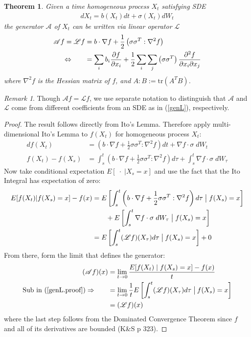 \documentclass[12pt]{article}
\theoremstyle{plain}
\newtheorem{thm}{Theorem}[section]
\theoremstyle{definition}
\theoremstyle{remark}
\newtheorem*{rmk}{Remark}
\begin{document}
\begin{thm}
Given a time homogeneous process $X_t$ satisfying SDE
\begin{align*}
  dX_t = b(X_t) dt + \sigma(X_t) dW_t
\end{align*}
the generator $\mathscr{A}$ of $X_t$ can be written via linear operator
$\mathscr{L}$
\begin{align}
  \mathscr{A}f =
  \mathscr{L}f &= b \cdot \nabla f
  + \frac{1}{2} \left(\sigma \sigma^T:\nabla^2 f\right)\label{genL} \\
  \Leftrightarrow \qquad
  &= \sum_i b_i \frac{\partial f}{\partial x_i}
  + \frac{1}{2} \sum_i \sum_j \left(\sigma \sigma^T\right)
    \frac{\partial^2 f}{\partial x_i \partial x_j}\notag
\end{align}
where $\nabla^2 f$ is the Hessian matrix of $f$, and $A:B :=
\text{tr}(A^T B)$.
\end{thm}
\begin{rmk}
Though $\mathscr{A}f = \mathscr{L}f$, we use separate notation to
distinguish that $\mathscr{A}$ and $\mathscr{L}$ come from different
coefficients from an SDE as in (\ref{genL}), respectively.
\end{rmk}
\begin{proof}
The result follows directly from Ito's Lemma. Therefore apply
multi-dimensional Ito's Lemma to $f(X_t)$ for homogeneous process $X_t$:
\begin{align*}
  df(X_t) &=
  \left(b\cdot \nabla f + \frac{1}{2}\sigma\sigma^T : \nabla^2 f\right)
  dt
  + \nabla f\cdot \sigma \;dW_t\\
  f(X_t) - f(X_s) &=
  \int^t_s
  \left(b\cdot \nabla f + \frac{1}{2}\sigma\sigma^T : \nabla^2 f\right)
  d\tau
  +
  \int^t_s
  \nabla f\cdot \sigma \;dW_\tau
\end{align*}
Now take conditional expectation $E[\;\cdot\;|X_s=x]$ and use the fact
that the Ito Integral has expectation of zero:
\begin{align}
  E[f(X_t)|f(X_s)=x] - f(x) &=
  E\left[
  \int^t_s
  \left(b\cdot \nabla f + \frac{1}{2}\sigma\sigma^T : \nabla^2 f\right)
  d\tau
  \; \big|\; f(X_s)=x\right]\notag\\
  &\qquad
  +
  E\left[
  \int^t_s
  \nabla f\cdot \sigma \;dW_\tau
  \; \big|\;f(X_s)=x\right]
  \notag\\
  &=
  E\left[ \int^t_s (\mathscr{L} f)(X_\tau) d\tau
    \;\big|\:f(X_s)=x\right] + 0
  \label{genL.proof}
\end{align}
From there, form the limit that defines the generator:
\begin{align*}
  (\mathscr{A}f)(x)
  &=\lim_{t\rightarrow0} \frac{E[f(X_t)\;|\;f(X_s)=x] - f(x)}{t}\\
  \text{Sub in (\ref{genL.proof})} \Rightarrow\qquad
  &=\lim_{t\rightarrow0} \frac{1}{t}
  E\left[ \int^t_s (\mathscr{L} f)(X_\tau) d\tau \; \big|\:f(X_s)=x\right]\\
  &=(\mathscr{L}f)(x)
\end{align*}
where the last step follows from the Dominated Convergence Theorem since
$f$ and all of its derivatives are bounded (K\&S p 323).
\end{proof}
\end{document}
